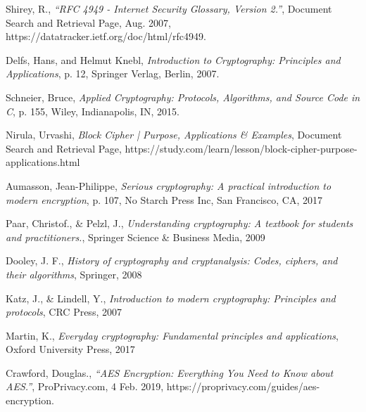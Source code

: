 \begin{thebibliography}{9}

  Shirey, R.,
  \emph{“RFC 4949 - Internet Security Glossary, Version 2.”},
  Document Search and Retrieval Page,
  Aug. 2007,
  https://datatracker.ietf.org/doc/html/rfc4949. 

  Delfs, Hans, and Helmut Knebl,
  \emph{Introduction to Cryptography: Principles and Applications},
  p. 12, Springer Verlag, Berlin,
  2007.
  
  Schneier, Bruce,
  \emph{Applied Cryptography: Protocols, Algorithms, and Source Code in C},
  p. 155, Wiley, Indianapolis, IN,
  2015.

  Nirula, Urvashi,
  \emph{Block Cipher | Purpose, Applications \& Examples},
  Document Search and Retrieval Page,
  https://study.com/learn/lesson/block-cipher-purpose-applications.html
  
  Aumasson, Jean-Philippe,
  \emph{Serious cryptography: A practical introduction to modern encryption},
  p. 107, No Starch Press Inc, San Francisco, CA, 
  2017
  
  Paar, Christof., \& Pelzl, J.,
 \emph{Understanding cryptography: A textbook for students and practitioners.},
  Springer Science \& Business Media,
  2009
  
  Dooley, J. F.,
  \emph{History of cryptography and cryptanalysis: Codes, ciphers, and their algorithms},
   Springer,
   2008
  
  Katz, J., \& Lindell, Y.,
  \emph{Introduction to modern cryptography: Principles and protocols},
  CRC Press,
  2007
  
  Martin, K.,
  \emph{Everyday cryptography: Fundamental principles and applications},
  Oxford University Press,
  2017
  
  Crawford, Douglas.,
  \emph{“AES Encryption: Everything You Need to Know about AES.”},
   ProPrivacy.com, 
   4 Feb. 2019, 
   https://proprivacy.com/guides/aes-encryption. 


 
  
%  
%
\end{thebibliography}
